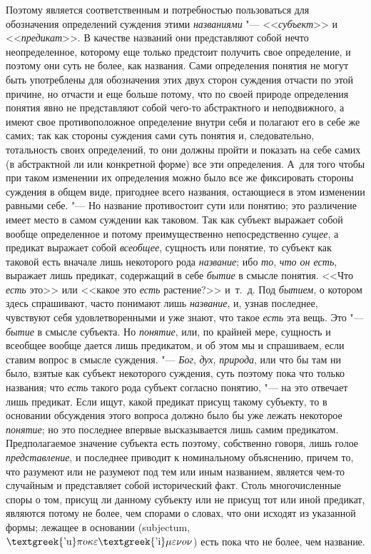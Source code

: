 {Поэтому является соответственным и потребностью пользоваться
для обозначения определений суждения этими
{\em названиями} "--- <<{\em субъект}>>
и <<{\em предикат}>>.
В качестве названий они представляют собой нечто
неопределенное, которому еще только предстоит получить свое определение, и
поэтому они суть не более, как названия. Сами определения понятия не могут
быть употреблены для обозначения этих двух сторон суждения отчасти по этой
причине, но отчасти и еще больше потому, что по своей природе определения
понятия явно не представляют собой чего-то абстрактного и неподвижного, а
имеют свое противоположное определение внутри себя и полагают его в себе же
самих; так как стороны суждения сами суть понятия и,
следовательно, тотальность своих определений, то они должны пройти и
показать на себе самих (в абстрактной ли или конкретной форме) все эти
определения. А~для того чтобы при таком изменении их определения можно было
все же фиксировать стороны суждения в общем виде, пригоднее всего названия,
остающиеся в этом изменении равными себе. "--- Но название
противостоит сути или понятию; это различение имеет место в самом суждении
как таковом. Так как субъект выражает собой вообще определенное и потому
преимущественно непосредственно
{\em сущее}, а предикат
выражает собой {\em всеобщее},
сущность или понятие, то субъект как таковой есть вначале
лишь некоторого рода {\em название};
ибо {\em то},
{\em что он есть},
выражает лишь предикат, содержащий в себе
{\em бытие} в смысле
понятия. <<Что {\em есть}
это>> или <<какое это
{\em есть} растение?>>
и~т.~д. Под {\em бытием},
о котором здесь спрашивают, часто понимают лишь
{\em название}, и, узнав
последнее, чувствуют себя удовлетворенными и уже знают, что такое
{\em есть} эта вещь. Это
"--- {\em бытие} в смысле
субъекта. Но
{\em понятие},
или, по крайней мере, сущность и всеобщее вообще дается лишь
предикатом, и об этом мы и спрашиваем, если ставим вопрос в смысле
суждения. "--- {\em Бог}, {\em дух}, {\em природа}, или что бы
там ни было, взятые как субъект некоторого суждения, суть поэтому пока что
только названия; что {\em есть}
такого рода субъект согласно понятию, "--- на это
отвечает лишь предикат. Если ищут, какой предикат присущ такому субъекту,
то в основании обсуждения этого вопроса должно было бы уже лежать некоторое
{\em понятие}; но это
последнее впервые высказывается лишь самим предикатом. Предполагаемое
значение субъекта есть поэтому, собственно говоря, лишь голое
{\em представление}, и
последнее приводит к номинальному объяснению, причем то, что разумеют или
не разумеют под тем или иным названием, является чем-то случайным и
представляет собой исторический факт. Столь многочисленные споры о том,
присущ ли данному субъекту или не присущ тот или иной предикат, являются
потому не более, чем спорами о словах, что они исходят из указанной формы;
лежащее в основании (subjectum, $\text{\textgreek{'u}}\pi o\kappa
\varepsilon \text{\textgreek{'i}}\mu \varepsilon \nu o\nu $) есть пока что
не более, чем название.

}

